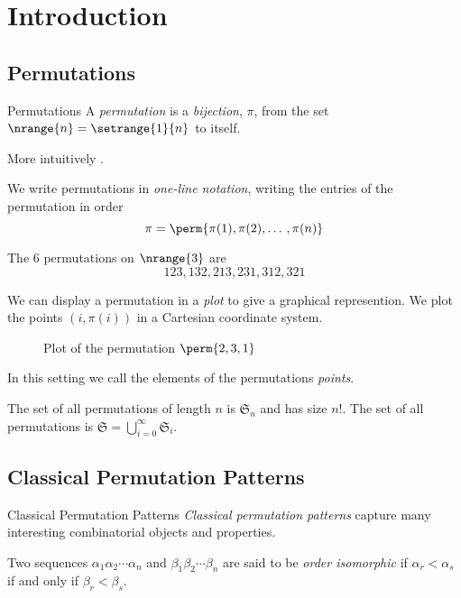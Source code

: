 \section{Introduction}
\label{sec:Introduction}
\subsection{Permutations}
\label{sub:Permutations}

\begin{frame}{Permutations}
  A \emph{permutation} is a \emph{bijection}, \(\pi\), from the set
  \(\nrange{n} = \setrange{1}{n}\) to itself.

  More intuitively .

  We write permutations in \emph{one-line notation}, writing
  the entries of the permutation in order
  \begin{equation*}
    \pi = \perm{\pi(1),\pi(2),\dotso,\pi(n)}
  \end{equation*}
  \begin{example} The \(6\) permutations on \(\nrange{3}\) are
    \begin{equation*}
      123, 132, 213, 231, 312, 321
    \end{equation*}
  \end{example}
\end{frame}

\begin{frame}
  We can display a permutation in a \emph{plot} to give a graphical
  represention. We plot the points \((i,\pi(i))\) in a Cartesian coordinate
  system.
  \begin{figure}[htb]
    \centering
    \caption{Plot of the permutation \(\perm{2,3,1}\)}
  \end{figure}
  In this setting we call the elements of the permutations \emph{points}.

  The set of all permutations of length \(n\) is \(\mathfrak{S}_n\) and
  has size \(n!\). The set of all permutations is
  \(\mathfrak{S}=\bigcup_{i=0}^{\infty}\mathfrak{S}_i\).
\end{frame}
\subsection{Classical Permutation Patterns}
\label{sub:Classical Permutation Patterns}

\begin{frame}{Classical Permutation Patterns}
  \emph{Classical permutation patterns} capture many interesting combinatorial
  objects and properties.

  \begin{definition}
    Two sequences \(\alpha_1\alpha_2\dotsm\alpha_n\) and
    \(\beta_1\beta_2\dotsm\beta_n\) are said to be \emph{order isomorphic}
    if \(\alpha_r<\alpha_s\) if and only if \(\beta_r<\beta_s\).
  \end{definition}
\end{frame}

